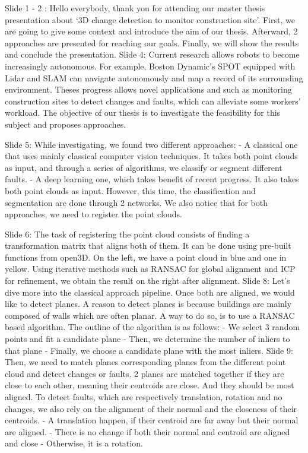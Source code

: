 Slide 1 - 2 :
Hello everybody, thank you for attending our master thesis presentation about ‘3D change detection to monitor construction site’.
First, we are going to give some context and introduce the aim of our thesis. Afterward, 2 approaches are presented for reaching our goals. Finally, we will show the results and conclude the presentation.
Slide 4:
Current research allows robots to become increasingly autonomous. For example, Boston Dynamic’s SPOT equipped with Lidar and SLAM can navigate autonomously and map a record of its surrounding environment.
Theses progress allows novel applications and such as monitoring construction sites to detect changes and faults, which can alleviate some workers’ workload.
The objective of our thesis is to investigate the feasibility for this subject and proposes approaches.

Slide 5:
While investigating, we found two different approaches:
-	A classical one that uses mainly classical computer vision techniques. It takes both point clouds as input, and through a series of algorithms, we classify or segment different faults.
-	A deep learning one, which takes benefit of recent progress. It also takes both point clouds as input. However, this time, the classification and segmentation are done through 2 networks.
We also notice that for both approaches, we need to register the point clouds.

Slide 6:
The task of registering the point cloud consists of finding a transformation matrix that aligns both of them.  It can be done using pre-built functions from open3D. 
On the left, we have a point cloud in blue and one in yellow. Using iterative methods such as RANSAC for global alignment and ICP for refinement, we obtain the result on the right after alignment.
Slide 8:
Let’s dive more into the classical approach pipeline. Once both are aligned, we would like to detect planes. A reason to detect planes is because buildings are mainly composed of walls which are often planar.
A way to do so, is to use a RANSAC based algorithm. The outline of the algorithm is as follows:
-	We select 3 random points and fit a candidate plane
-	Then, we determine the number of inliers to that plane
-	Finally, we choose a candidate plane with the most inliers.
Slide 9:
Then, we need to match planes corresponding planes from the different point cloud and detect changes or faults. 
2 planes are matched together if they are close to each other, meaning their centroids are close. And they should be most aligned.
To detect faults, which are respectively translation, rotation and no changes, we also rely on the alignment of their normal and the closeness of their centroids.
-	A translation happen, if their centroid are far away but their normal are aligned.
-	There is no change if both their normal and centroid are aligned and close
-	Otherwise, it is a rotation.

